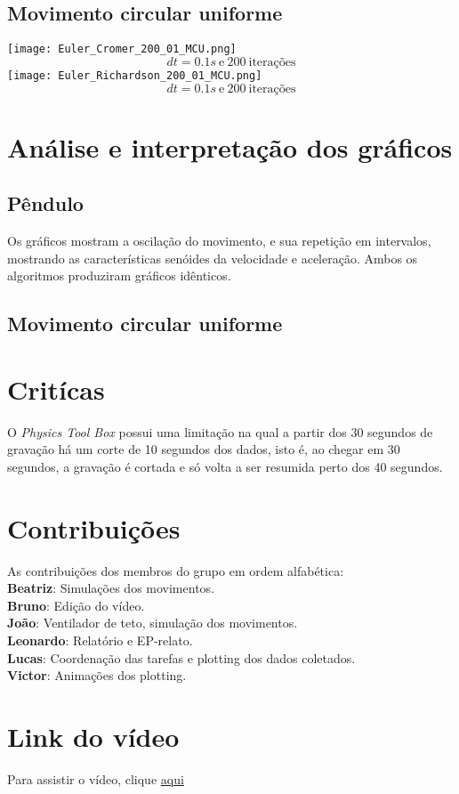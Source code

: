\documentclass[a4paper, 12pt]{article}
\begin{document}
\subsection*{Movimento circular uniforme}
\texttt{[image: Euler\_Cromer\_200\_01\_MCU.png]} \\
$$dt=0.1s\ \text{e}\ 200\ \text{iterações}$$
\texttt{[image: Euler\_Richardson\_200\_01\_MCU.png]} \\
$$dt=0.1s\ \text{e}\ 200\ \text{iterações}$$


\section*{Análise e interpretação dos gráficos}
\subsection*{Pêndulo}
Os gráficos mostram a oscilação do movimento, e sua repetição em intervalos, 
mostrando as características senóides da velocidade e aceleração. Ambos os 
algoritmos produziram gráficos idênticos.

\subsection*{Movimento circular uniforme}


\section*{Critícas}
O \textit{Physics Tool Box} possui uma limitação na qual a partir dos 30 
segundos de gravação há um corte de 10 segundos dos dados, isto é, ao chegar
em 30 segundos, a gravação é cortada e só volta a ser resumida perto dos 40
segundos.

\section*{Contribuições}
As contribuições dos membros do grupo em ordem alfabética: \\
\textbf{Beatriz}: Simulações dos movimentos. \\
\textbf{Bruno}: Edição do vídeo.\\
\textbf{João}: Ventilador de teto, simulação dos movimentos.\\
\textbf{Leonardo}: Relatório e EP-relato.\\
\textbf{Lucas}: Coordenação das tarefas e plotting dos dados coletados.\\
\textbf{Victor}: Animações dos plotting.\\

\section*{Link do vídeo}
Para assistir o vídeo, clique
\href{https://youtu.be/roxjSn8T0NI}{aqui}
\end{document}
